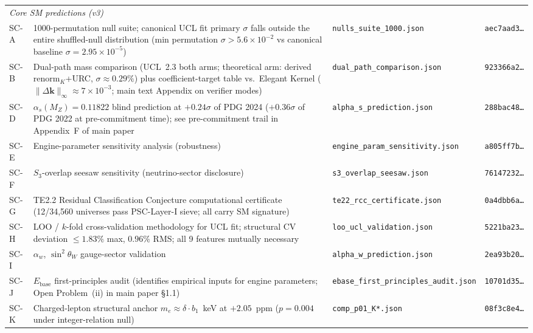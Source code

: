\documentclass[10pt]{article}
\begin{document}
\begin{longtable}{@{} p{1.4cm} p{5.0cm} p{4.0cm} p{3.4cm} @{}}
\multicolumn{4}{l}{\textit{Core SM predictions (v3)}} \\[2pt]
SC-A & 1000-permutation null suite; canonical UCL fit primary $\sigma$ falls outside the entire shuffled-null distribution (min permutation $\sigma > 5.6 \times 10^{-2}$ vs canonical baseline $\sigma = 2.95 \times 10^{-5}$) & \nolinkurl{nulls_suite_1000.json} & \texttt{aec7aad3\ldots} \\
SC-B & Dual-path mass comparison (UCL~2.3 both arms; theoretical arm: derived $\mathrm{renorm}_K$+URC, $\sigma\approx 0.29\%$) plus coefficient-target table vs.\ Elegant Kernel ($\|\Delta\mathbf{k}\|_\infty\approx 7\times 10^{-3}$; main text Appendix on verifier modes) & \nolinkurl{dual_path_comparison.json} & \texttt{923366a2\ldots} \\
SC-D & $\alpha_s(M_Z) = 0.11822$ blind prediction at $+0.24\sigma$ of PDG 2024 ($+0.36\sigma$ of PDG 2022 at pre-commitment time); see pre-commitment trail in Appendix~F of main paper & \nolinkurl{alpha_s_prediction.json} & \texttt{288bac48\ldots} \\
SC-E & Engine-parameter sensitivity analysis (robustness) & \nolinkurl{engine_param_sensitivity.json} & \texttt{a805ff7b\ldots} \\
SC-F & $S_3$-overlap seesaw sensitivity (neutrino-sector disclosure) & \nolinkurl{s3_overlap_seesaw.json} & \texttt{76147232\ldots} \\
SC-G & TE2.2 Residual Classification Conjecture computational certificate (12/34,560 universes pass PSC-Layer-I sieve; all carry SM signature) & \nolinkurl{te22_rcc_certificate.json} & \texttt{0a4dbb6a\ldots} \\
SC-H & LOO / $k$-fold cross-validation methodology for UCL fit; structural CV deviation $\le 1.83\%$ max, $0.96\%$ RMS; all 9 features mutually necessary & \nolinkurl{loo_ucl_validation.json} & \texttt{5221ba23\ldots} \\
SC-I & $\alpha_w$, $\sin^2\theta_W$ gauge-sector validation & \nolinkurl{alpha_w_prediction.json} & \texttt{2ea93b20\ldots} \\
SC-J & $E_{\mathrm{base}}$ first-principles audit (identifies empirical inputs for engine parameters; Open Problem~(ii) in main paper \S1.1) & \nolinkurl{ebase_first_principles_audit.json} & \texttt{10701d35\ldots} \\
SC-K & Charged-lepton structural anchor $m_e \approx \delta\cdot b_1$~keV at $+2.05$~ppm ($p = 0.004$ under integer-relation null) & \nolinkurl{comp_p01_K*.json} & \texttt{08f3c8e4\ldots} \\

\end{longtable}
\end{document}
